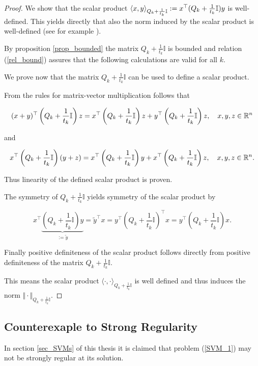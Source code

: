 \begin{proof}
	We show that the scalar product \(\left\langle x,y \right\rangle_{Q_k+\frac{1}{t_k}\mathbb{I}} := x^{\top} (Q_k+\frac{1}{t_k}\mathbb{I})y\) is well-defined.
	This yields directly that also the norm induced by the scalar product is well-defined (see for example \cite[Corollary 12.6, p. 172]{Liesen2015}).
	
	By proposition \ref{prop_bounded} the matrix \(Q_k+\frac{1}{t_k}\mathbb{I}\) is bounded and relation (\ref{rel_bound}) assures that the following calculations are valid for all \(k\).
	
	We prove now that the matrix \(Q_k+\frac{1}{t_k}\mathbb{I}\) can be used to define a scalar product.
	
From the rules for matrix-vector multiplication follows that

\[ (x+y)^{\top}\left(Q_k+\frac{1}{t_k}\mathbb{I}\right)z = x^{\top}\left(Q_k+\frac{1}{t_k}\mathbb{I}\right)z + y^{\top}\left(Q_k+\frac{1}{t_k}\mathbb{I}\right)z, \quad x,y,z \in \mathbb{R}^n\]

and 

\[ x^{\top}\left(Q_k+\frac{1}{t_k}\mathbb{I}\right)(y+z) = x^{\top}\left(Q_k+\frac{1}{t_k}\mathbb{I}\right)y + x^{\top}\left(Q_k+\frac{1}{t_k}\mathbb{I}\right)z, \quad x,y,z \in \mathbb{R}^n.\]

Thus linearity of the defined scalar product is proven.

The symmetry of \(Q_k+\frac{1}{t_k}\mathbb{I}\) yields symmetry of the scalar product by

\[ x^{\top} \underbrace{\left(Q_k+\frac{1}{t_k}\mathbb{I}\right)y}_{:=\tilde{y}} = \tilde{y}^{\top}x = y^{\top}\left(Q_k+\frac{1}{t_k}\mathbb{I}\right)^{\top}x = y^{\top}\left(Q_k+\frac{1}{t_k}\mathbb{I}\right)x.   \]

Finally positive definiteness of the scalar product follows directly from positive definiteness of the matrix \(Q_k+\frac{1}{t_k}\mathbb{I}\).

This means the scalar product \(\langle \cdot,\cdot \rangle_{Q_k+\frac{1}{t_k}\mathbb{I}}\) is well defined and thus induces the norm \(\Vert \cdot \Vert_{Q_k+\frac{1}{t_k}\mathbb{I}}\).
\end{proof}

\subsection{Counterexaple to Strong Regularity}
\label{sec_counter_ex}
In section \ref{sec_SVMs} of this thesis it is claimed that problem (\ref{SVM_1}) may not be strongly regular at its solution.

